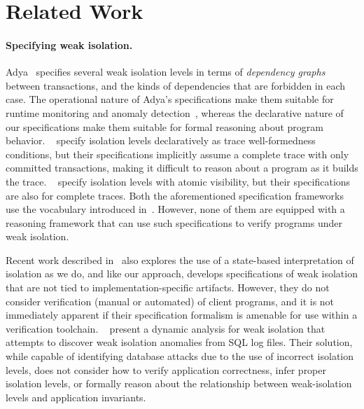 \section{Related Work}
\label{sec:relatedwork}

\paragraph{Specifying weak isolation.}
Adya~\cite{adyaphd} specifies several weak isolation levels in terms
of \emph{dependency graphs} between transactions, and the kinds of
dependencies that are forbidden in each case. The operational nature
of Adya's specifications make them suitable for runtime monitoring and
anomaly detection~\cite{kemmevldb,feketesigmod08,pssi2011}, whereas
the declarative nature of our specifications make them suitable for
formal reasoning about program behavior. ~\cite{pldi15} specify
isolation levels declaratively as trace well-formedness conditions,
but their specifications implicitly assume a complete trace with only
committed transactions, making it difficult to reason about a program
as it builds the trace. ~\cite{gotsmanconcur15} specify isolation
levels with atomic visibility, but their specifications are also for
complete traces.  Both the aforementioned specification frameworks use
the vocabulary introduced in~\cite{burckhardt14}. However, none of
them are equipped with a reasoning framework that can use such
specifications to verify programs under weak isolation.

Recent work described in~\cite{CPA+17} also explores the
use of a state-based interpretation of isolation as we do, and 
like our approach, develops specifications of weak isolation that are not
tied to implementation-specific artifacts.  However, they do not
consider verification (manual or automated) of client programs, and it
is not immediately apparent if their specification formalism is
amenable for use within a verification toolchain. ~\cite{WB17}
present a dynamic analysis for weak isolation that attempts to
discover weak isolation anomalies from SQL log files.  Their solution,
while capable of identifying database attacks due to the use of
incorrect isolation levels, does not consider how
to verify application correctness, infer proper isolation levels, or
formally reason about the relationship between weak-isolation levels
and application invariants.
